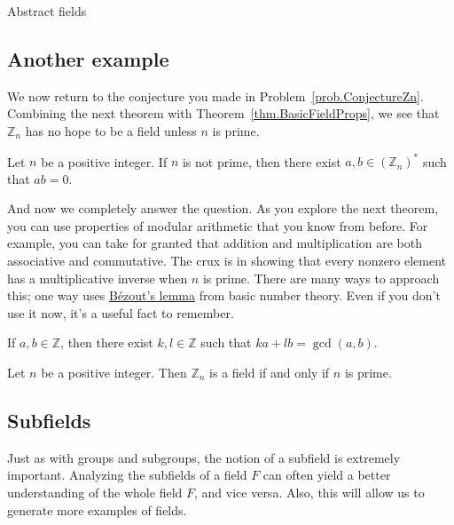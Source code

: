 \begin{section}{Abstract fields}
\subsection{Another example}
We now return to the conjecture you made in Problem~\ref{prob.ConjectureZn}. Combining the next theorem with Theorem~\ref{thm.BasicFieldProps}, we see that $\mathbb{Z}_n$ has no hope to be a field unless $n$ is prime.

\begin{theorem}
Let $n$ be a positive integer. If $n$ is not prime, then there exist $a,b\in (\mathbb{Z}_n)^*$ such that $ab=0$.
\end{theorem}

And now we completely answer the question. As you explore the next theorem, you can use properties of modular arithmetic that you know from before. For example, you can take for granted that addition and multiplication are both associative and commutative. The crux is in showing that every nonzero element has a multiplicative inverse when $n$ is prime. There are many ways to approach this; one way uses \href{https://en.wikipedia.org/wiki/Bezout\%27s_identity}{B\'ezout's lemma} from basic number theory. Even if you don't use it now, it's a  useful fact to remember.

\begin{fact}
If $a,b\in \mathbb{Z}$, then there exist $k,l\in \mathbb{Z}$ such that $ka+lb = \gcd(a,b)$.
\end{fact}

\begin{theorem}\label{thm.ZpField}
Let $n$ be a positive integer. Then $\mathbb{Z}_n$ is a field if and only if $n$ is prime.
\end{theorem}

\subsection{Subfields}

Just as with groups and subgroups, the notion of a subfield is extremely important. Analyzing the subfields of a field $F$ can often yield a better understanding of the whole field $F$, and vice versa. Also, this will allow us to generate  more examples of fields.


\end{section}
